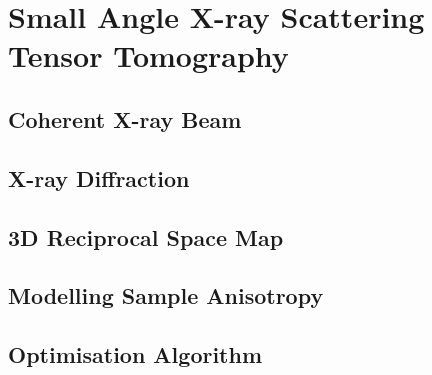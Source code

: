 \chapter{Small Angle X-ray Scattering Tensor Tomography}

\section{Coherent X-ray Beam}

\section{X-ray Diffraction}

\section{3D Reciprocal Space Map}

\section{Modelling Sample Anisotropy}

\section{Optimisation Algorithm}